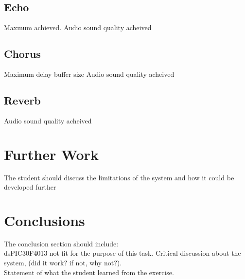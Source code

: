 \documentclass[titlepage]{scrartcl}
\begin{document}
        \subsection{Echo}
        Maxmum  achieved.
        Audio sound quality acheived
        \subsection{Chorus}
        Maximum delay buffer size
        Audio sound quality acheived
        \subsection{Reverb}
        Audio sound quality acheived

        
    \section{Further Work}
    The student should discuss the limitations of the system and how it could be developed further

    \section{Conclusions}
    The conclusion section should include:\\
    dsPIC30F4013 not fit for the purpose of this task.
        Critical discussion about the system, (did it work? if not, why
        not?).\\
        Statement of what the student learned from the exercise.\\

    \printbibliography
\end{document}
